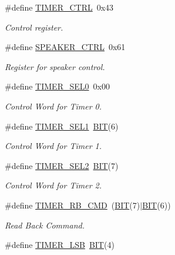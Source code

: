 \begin{DoxyCompactItemize}
\#define \hyperlink{group__i8254_ga282832448fb0281ef53d243c1cd48491}{T\+I\+M\+E\+R\+\_\+\+C\+T\+R\+L}~0x43
\begin{DoxyCompactList}\small\item\em Control register. \end{DoxyCompactList}\item 
\#define \hyperlink{group__i8254_ga51b3a5e3d4811ca063fe25e35560ab40}{S\+P\+E\+A\+K\+E\+R\+\_\+\+C\+T\+R\+L}~0x61
\begin{DoxyCompactList}\small\item\em Register for speaker control. \end{DoxyCompactList}\item 
\#define \hyperlink{group__i8254_ga6a4822642d40c248435692324a818010}{T\+I\+M\+E\+R\+\_\+\+S\+E\+L0}~0x00
\begin{DoxyCompactList}\small\item\em Control Word for Timer 0. \end{DoxyCompactList}\item 
\#define \hyperlink{group__i8254_ga8349623fd8d99f9cc5d8ae29d78594fc}{T\+I\+M\+E\+R\+\_\+\+S\+E\+L1}~\hyperlink{group__i8254_ga3a8ea58898cb58fc96013383d39f482c}{B\+I\+T}(6)
\begin{DoxyCompactList}\small\item\em Control Word for Timer 1. \end{DoxyCompactList}\item 
\#define \hyperlink{group__i8254_ga142a255de0dbc48aeabd45fc10c33672}{T\+I\+M\+E\+R\+\_\+\+S\+E\+L2}~\hyperlink{group__i8254_ga3a8ea58898cb58fc96013383d39f482c}{B\+I\+T}(7)
\begin{DoxyCompactList}\small\item\em Control Word for Timer 2. \end{DoxyCompactList}\item 
\#define \hyperlink{group__i8254_ga4c2eecbfb96744a9c2af71dba75ecb18}{T\+I\+M\+E\+R\+\_\+\+R\+B\+\_\+\+C\+M\+D}~(\hyperlink{group__i8254_ga3a8ea58898cb58fc96013383d39f482c}{B\+I\+T}(7)$\vert$\hyperlink{group__i8254_ga3a8ea58898cb58fc96013383d39f482c}{B\+I\+T}(6))
\begin{DoxyCompactList}\small\item\em Read Back Command. \end{DoxyCompactList}\item 
\#define \hyperlink{group__i8254_gac18cb814ebd0d67235392c330e0e3504}{T\+I\+M\+E\+R\+\_\+\+L\+S\+B}~\hyperlink{group__i8254_ga3a8ea58898cb58fc96013383d39f482c}{B\+I\+T}(4)

\end{DoxyCompactItemize}

